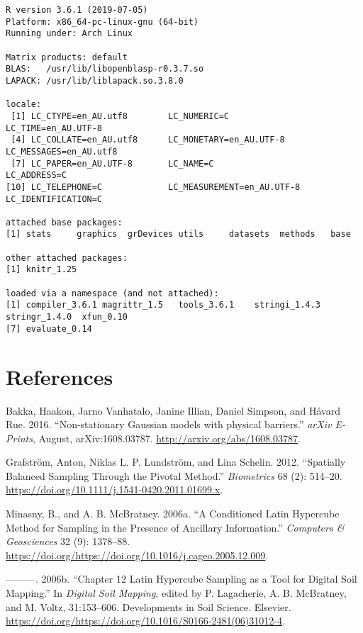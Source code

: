 \documentclass[a4paper]{article}
\begin{document}
\begin{verbatim}
R version 3.6.1 (2019-07-05)
Platform: x86_64-pc-linux-gnu (64-bit)
Running under: Arch Linux

Matrix products: default
BLAS:   /usr/lib/libopenblasp-r0.3.7.so
LAPACK: /usr/lib/liblapack.so.3.8.0

locale:
 [1] LC_CTYPE=en_AU.utf8        LC_NUMERIC=C               LC_TIME=en_AU.UTF-8       
 [4] LC_COLLATE=en_AU.utf8      LC_MONETARY=en_AU.UTF-8    LC_MESSAGES=en_AU.utf8    
 [7] LC_PAPER=en_AU.UTF-8       LC_NAME=C                  LC_ADDRESS=C              
[10] LC_TELEPHONE=C             LC_MEASUREMENT=en_AU.UTF-8 LC_IDENTIFICATION=C       

attached base packages:
[1] stats     graphics  grDevices utils     datasets  methods   base     

other attached packages:
[1] knitr_1.25

loaded via a namespace (and not attached):
[1] compiler_3.6.1 magrittr_1.5   tools_3.6.1    stringi_1.4.3  stringr_1.4.0  xfun_0.10     
[7] evaluate_0.14 
\end{verbatim}

\hypertarget{references}{%
\section*{References}\label{references}}

\hypertarget{refs}{}
\leavevmode\hypertarget{ref-Bakka-2016-1608}{}%
Bakka, Haakon, Jarno Vanhatalo, Janine Illian, Daniel Simpson, and
Håvard Rue. 2016. ``Non-stationary Gaussian models with physical
barriers.'' \emph{arXiv E-Prints}, August, arXiv:1608.03787.
\url{http://arxiv.org/abs/1608.03787}.

\leavevmode\hypertarget{ref-Grafstrom-2012}{}%
Grafström, Anton, Niklas L. P. Lundström, and Lina Schelin. 2012.
``Spatially Balanced Sampling Through the Pivotal Method.''
\emph{Biometrics} 68 (2): 514--20.
\url{https://doi.org/10.1111/j.1541-0420.2011.01699.x}.

\leavevmode\hypertarget{ref-Minasny-2006-1378}{}%
Minasny, B., and A. B. McBratney. 2006a. ``A Conditioned Latin Hypercube
Method for Sampling in the Presence of Ancillary Information.''
\emph{Computers \& Geosciences} 32 (9): 1378--88.
\url{https://doi.org/https://doi.org/10.1016/j.cageo.2005.12.009}.

\leavevmode\hypertarget{ref-Minasny-2006-153}{}%
---------. 2006b. ``Chapter 12 Latin Hypercube Sampling as a Tool for
Digital Soil Mapping.'' In \emph{Digital Soil Mapping}, edited by P.
Lagacherie, A. B. McBratney, and M. Voltz, 31:153--606. Developments in
Soil Science. Elsevier.
\url{https://doi.org/https://doi.org/10.1016/S0166-2481(06)31012-4}.
\end{document}
